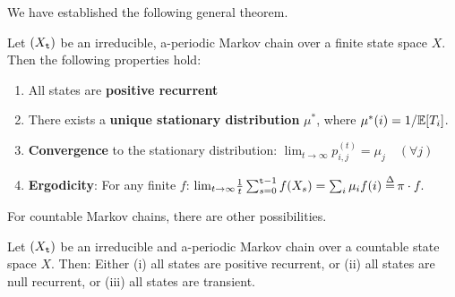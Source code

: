 We have established the following general theorem.

\begin{theorem}
Let $({X_{\tt t}})$ be an irreducible,  a-periodic Markov chain over
a finite state space $X$.  Then the following properties hold:
\begin{enumerate}
\item All states are \textbf{positive recurrent}
\item There exists a \textbf{unique stationary distribution}
${\mu^*}$, where $\mu^*(i)=1/\mathbb{E}[T_i]$.
\item \textbf{Convergence} to the stationary distribution: ${\lim _{t \to \infty }}p_{i,j}^{(t)} = {\mu_j}\quad (\forall j)$
\item \textbf{Ergodicity}: For any finite $f$: ${\lim _{t \to \infty }}\frac{1}{t}\sum\nolimits_{s = 0}^{\ttime - 1} {f({X_s}) = \sum\nolimits_i {\mu_i f(i) \buildrel \Delta \over = } } \,\pi  \cdot f.$
\end{enumerate}
\end{theorem}

%
%
%
%

For countable Markov chains, there are other possibilities.

\begin{theorem}
\label{thm:countableMC}
Let $({X_{\tt t}})$ be an irreducible and a-periodic Markov chain
over a countable state space $X$.  Then:
Either (i) all states are positive recurrent, or (ii) all states are null recurrent, or (iii) all states are transient.
\end{theorem}


